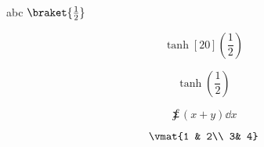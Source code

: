 
abc $\braket{\frac{1}{2}}$

\begin{equation}
\tanh[20](\frac12)
\end{equation}

\begin{equation}
\tanh(\frac12)
\end{equation}

\begin{equation}
\sumint (x + y) \dd{x}
\end{equation}

\begin{equation}
\vmat{1 & 2\\ 3& 4}
\end{equation}
